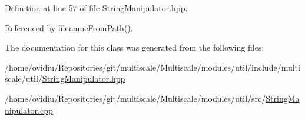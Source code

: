 \-Definition at line 57 of file \-String\-Manipulator.\-hpp.



\-Referenced by filename\-From\-Path().



\-The documentation for this class was generated from the following files\-:\begin{DoxyCompactItemize}
\item 
/home/ovidiu/\-Repositories/git/multiscale/\-Multiscale/modules/util/include/multiscale/util/\hyperlink{StringManipulator_8hpp}{\-String\-Manipulator.\-hpp}\item 
/home/ovidiu/\-Repositories/git/multiscale/\-Multiscale/modules/util/src/\hyperlink{StringManipulator_8cpp}{\-String\-Manipulator.\-cpp}\end{DoxyCompactItemize}
